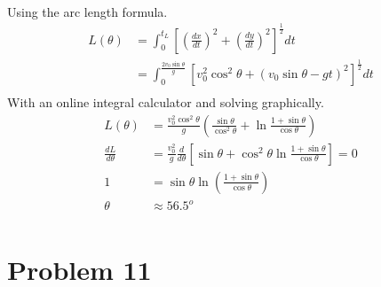 \documentclass[]{article}
\begin{document}
{			\paragraph{} Using the arc length formula.
			\begin{equation*}
				\begin{split}
					L(\theta) &= \int_{0}^{t_L} \left[ \left( \frac{dx}{dt} \right)^2 + \left( \frac{dy}{dt} \right)^2 \right]^{\frac{1}{2}} dt \\
					&= \int_{0}^{\frac{2v_0 \sin \theta}{g}} \left[ v_0^2 \cos^2 \theta + \left( v_0 \sin \theta - gt \right)^2 \right]^{\frac{1}{2}} dt \\
				\end{split}
			\end{equation*}
			With an online integral calculator and solving graphically.
			\begin{equation*}
				\begin{split}
					L(\theta) &= \frac{v_0^2 \cos^2 \theta}{g} \left( \frac{\sin \theta}{\cos^2 \theta} + \ln \frac{1 + \sin \theta}{\cos \theta} \right) \\
					\frac{dL}{d\theta} &= \frac{v_0^2}{g} \frac{d}{d\theta} \left[ \sin \theta + \cos^2 \theta \ln \frac{1 + \sin \theta}{\cos \theta} \right] = 0 \\
					1 &= \sin \theta \ln \left( \frac{1 + \sin \theta}{\cos \theta} \right) \\
					\theta &\approx 56.5^o \\
				\end{split}
			\end{equation*}
			
	\clearpage

	\section*{Problem 11}

}
\end{document}
